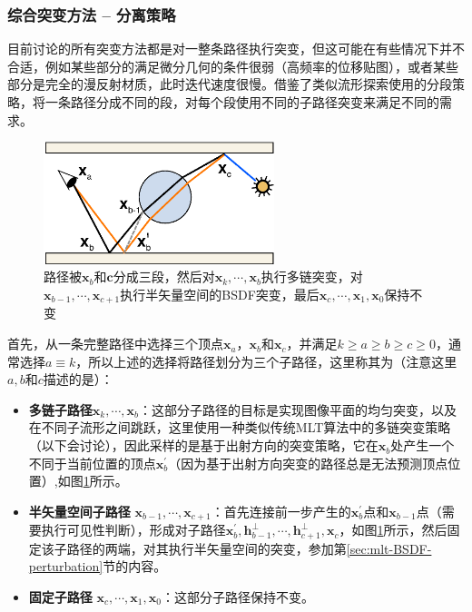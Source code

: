 \subsubsection{综合突变方法 -- 分离策略}
目前讨论的所有突变方法都是对一整条路径执行突变，但这可能在有些情况下并不合适，例如某些部分的满足微分几何的条件很弱（高频率的位移贴图），或者某些部分是完全的漫反射材质，此时迭代速度很慢。\cite{a:ImprovedHalfVectorSpaceLightTransport}借鉴了类似流形探索使用的分段策略，将一条路径分成不同的段，对每个段使用不同的子路径突变来满足不同的需求。

\begin{figure}
	\sidecaption
	\includegraphics[width=0.6\textwidth]{figures/mlt/breakup}
	\caption{路径被$\mathbf{x}_b$和$\mathbf{c}$分成三段，然后对$\mathbf{x}_k,\cdots,\mathbf{x}_b$执行多链突变，对$\mathbf{x}_{b-1},\cdots,\mathbf{x}_{c+1}$执行半矢量空间的BSDF突变，最后$\mathbf{x}_c,\cdots,\mathbf{x}_1,\mathbf{x}_0$保持不变}
	\label{f:mlt-breakup}
\end{figure}

首先，从一条完整路径中选择三个顶点$\mathbf{x}_a$，$\mathbf{x}_b$和$\mathbf{x}_c$，并满足$k\geq a\geq b\geq c\geq 0$，通常选择$a\equiv k$，所以上述的选择将路径划分为三个子路径，这里称其为（注意这里$a,b$和$c$描述的是）：

\begin{itemize}
	\item \textbf{多链子路径}$\mathbf{x}_k,\cdots,\mathbf{x}_b$：这部分子路径的目标是实现图像平面的均匀突变，以及在不同子流形之间跳跃，这里使用一种类似传统MLT算法中的多链突变策略（以下会讨论），因此采样的是基于出射方向的突变策略，它在$\mathbf{x}_b$处产生一个不同于当前位置的顶点$\mathbf{x}^{'}_b$（因为基于出射方向突变的路径总是无法预测顶点位置）,如图\ref{f:mlt-breakup}所示。
	\item \textbf{半矢量空间子路径 }$\mathbf{x}_{b-1},\cdots,\mathbf{x}_{c+1}$：首先连接前一步产生的$\mathbf{x}^{'}_b$点和$\mathbf{x}_{b-1}$点（需要执行可见性判断），形成对子路径$\mathbf{x}^{'}_b,\mathbf{h}^{\perp}_{b-1},\cdots,\mathbf{h}^{\perp}_{c+1},\mathbf{x}_c$，如图\ref{f:mlt-breakup}所示，然后固定该子路径的两端，对其执行半矢量空间的突变，参加第\ref{sec:mlt-BSDF-perturbation}节的内容。
	\item \textbf{固定子路径 }$\mathbf{x}_c,\cdots,\mathbf{x}_1,\mathbf{x}_0$：这部分子路径保持不变。
\end{itemize}

